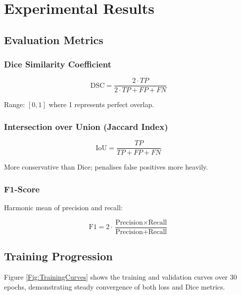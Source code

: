 \documentclass{ecsproject}     %
\begin{document}

\chapter{Experimental Results} \label{Chapter:Results}

\section{Evaluation Metrics}

\subsection{Dice Similarity Coefficient}

\begin{equation}
\text{DSC} = \frac{2 \cdot TP}{2 \cdot TP + FP + FN}
\end{equation}

Range: $[0, 1]$ where 1 represents perfect overlap.

\subsection{Intersection over Union (Jaccard Index)}

\begin{equation}
\text{IoU} = \frac{TP}{TP + FP + FN}
\end{equation}

More conservative than Dice; penalises false positives more heavily.

\subsection{F1-Score}

Harmonic mean of precision and recall:

\begin{equation}
\text{F1} = 2 \cdot \frac{\text{Precision} \times \text{Recall}}{\text{Precision} + \text{Recall}}
\end{equation}

\section{Training Progression}

Figure \ref{Fig:TrainingCurves} shows the training and validation curves over 30 epochs, demonstrating steady convergence of both loss and Dice metrics.
\end{document}
